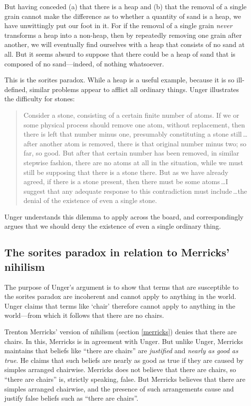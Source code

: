 \documentclass[11pt]{article}
\newenvironment{squote}{%
	\begin{quote}\begin{singlespace}%
	}{%
	\end{singlespace}\end{quote}}
\begin{document}
\begin{spacing}{1.5}
But having conceded (a) that there is a heap and (b) that the removal
of a single grain cannot make the difference as to whether a quantity
of sand is a heap, we have unwittingly put our foot in it.  For if the
removal of a single grain {\em never} transforms a heap into a
non-heap, then by repeatedly removing one grain after another, we will
eventually find ourselves with a heap that consists of no sand at
all.  But it seems absurd to suppose that there could be a heap of
sand that is composed of no sand---indeed, of nothing whatsoever.

This is the sorites paradox.  While a heap is a useful example,
because it is so ill-defined, similar problems appear to afflict all
ordinary things.  Unger illustrates the difficulty for stones:

\begin{squote}
Consider a stone, consisting of a certain finite number of atoms.  If
we or some physical process should remove one atom, without
replacement, then there is left that number minus one, presumably
constituting a stone still\,\ldots after another atom is removed,
there is that original number minus two; so far, so good.  But after
that certain number has been removed, in similar stepwise fashion,
there are no atoms at all in the situation, while we must still be
supposing that there is a stone there.  But as we have already agreed,
if there is a stone present, then there must be some atoms\,\ldots I
suggest that any adequate response to this contradiction must
include\,\ldots the denial of the existence of even a single
stone.~\citep[121--122]{unger1979}
\end{squote}
Unger understands this dilemma to apply across the board, and
correspondingly argues that we should deny the existence of even a
single ordinary thing.

\subsection{The sorites paradox in relation to Merricks' nihilism}
\label{sorites-m}
The purpose of Unger's argument is to show that terms that are
susceptible to the sorites paradox are incoherent and cannot apply to
anything in the world.  Unger claims that terms like `chair' therefore
cannot apply to anything in the world---from which it follows that
there are no chairs.

Trenton Merricks' version of nihilism (section \ref{merricks}) denies
that there are chairs.  In this, Merricks is in agreement with Unger.
But unlike Unger, Merricks maintains that beliefs like ``there are
chairs'' are {\em justified} and {\em nearly as good as true}.  He
claims that such beliefs are nearly as good as true if they are caused
by simples arranged chairwise.  Merricks does not believe that there
are chairs, so ``there are chairs'' is, strictly speaking, false.  But
Merricks believes that there are simples arranged chairwise, and the
presence of such arrangements cause and justify false beliefs such as
``there are chairs''.


\end{spacing}
\end{document}
